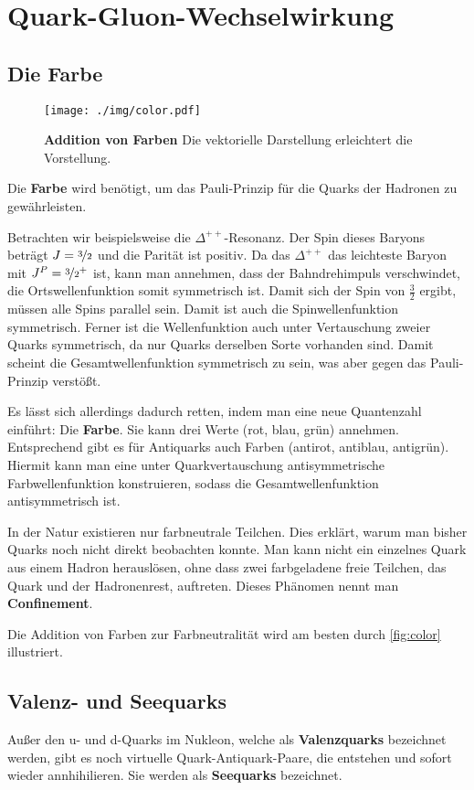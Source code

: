 \section{Quark-Gluon-Wechselwirkung}
\subsection{Die Farbe}
\begin{figure}
	\centering
	\texttt{[image: ./img/color.pdf]}
	\caption[Addition von Farben]{\textbf{Addition von Farben} Die vektorielle Darstellung erleichtert die Vorstellung.}
	\label{fig:color}
\end{figure}
Die \textbf{Farbe} wird benötigt, um das Pauli-Prinzip für die Quarks der Hadronen zu gewährleisten.

Betrachten wir beispielsweise die $\Delta^{++}$-Resonanz.
Der Spin dieses Baryons beträgt $J=\nicefrac{3}{2}$ und die Parität ist positiv.
Da das $\Delta^{++}$ das leichteste Baryon mit $J^P=\nicefrac{3}{2}^+$ ist, kann man annehmen, dass der Bahndrehimpuls verschwindet, die Ortswellenfunktion somit symmetrisch ist.
Damit sich der Spin von $\tfrac{3}{2}$ ergibt, müssen alle Spins parallel sein.
Damit ist auch die Spinwellenfunktion symmetrisch.
Ferner ist die Wellenfunktion auch unter Vertauschung zweier Quarks symmetrisch, da nur Quarks derselben Sorte vorhanden sind.
Damit scheint die Gesamtwellenfunktion symmetrisch zu sein, was aber gegen das Pauli-Prinzip verstößt.

Es lässt sich allerdings dadurch retten, indem man eine neue Quantenzahl einführt: Die \textbf{Farbe}.
Sie kann drei Werte (rot, blau, grün) annehmen.
Entsprechend gibt es für Antiquarks auch Farben (antirot, antiblau, antigrün).
Hiermit kann man eine unter Quarkvertauschung antisymmetrische Farbwellenfunktion konstruieren, sodass die Gesamtwellenfunktion antisymmetrisch ist.

In der Natur existieren nur farbneutrale Teilchen.
Dies erklärt, warum man bisher Quarks noch nicht direkt beobachten konnte.
Man kann nicht ein einzelnes Quark aus einem Hadron herauslösen, ohne dass zwei farbgeladene freie Teilchen, das Quark und der Hadronenrest, auftreten.
Dieses Phänomen nennt man \textbf{Confinement}.

Die Addition von Farben zur Farbneutralität wird am besten durch \autoref{fig:color} illustriert.

\subsection{Valenz- und Seequarks}
Außer den u- und d-Quarks im Nukleon, welche als \textbf{Valenzquarks} bezeichnet werden, gibt es noch virtuelle Quark-Antiquark-Paare, die entstehen und sofort wieder annhihilieren.
Sie werden als \textbf{Seequarks} bezeichnet.

